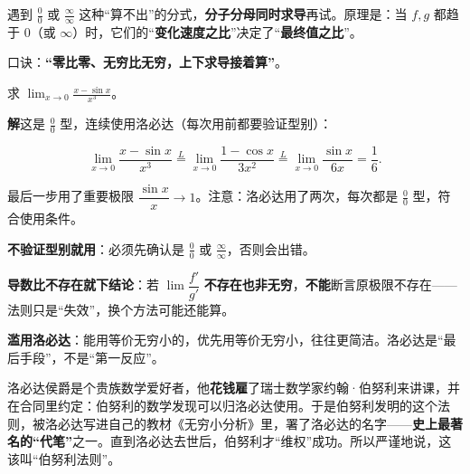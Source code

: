 \documentclass[11pt,a4paper]{article}
\newcommand{\keyw}[1]{\colorbox{cYellowL}{\textbf{\color{cOrange}#1}}}
\begin{document}
\begin{plainbox}[白话解读：洛必达 = “上下同时求导”]
遇到 $\tfrac{0}{0}$ 或 $\tfrac{\infty}{\infty}$ 这种“算不出”的分式，\keyw{分子分母同时求导}再试。原理是：当 $f,g$ 都趋于 $0$（或 $\infty$）时，它们的“\textbf{变化速度之比}”决定了“\textbf{最终值之比}”。

口诀：\keyw{“零比零、无穷比无穷，上下求导接着算”}。
\end{plainbox}

\begin{egbox}[洛必达法则求极限]
求 $\displaystyle\lim_{x\to 0}\frac{x-\sin x}{x^3}$。

\textbf{解}\quad 这是 $\tfrac{0}{0}$ 型，连续使用洛必达（每次用前都要验证型别）：
\begin{eqbox}\[ \lim_{x\to 0}\frac{x-\sin x}{x^3}
   \overset{L}{=}\lim_{x\to 0}\frac{1-\cos x}{3x^2}
   \overset{L}{=}\lim_{x\to 0}\frac{\sin x}{6x}
   =\boxed{\frac{1}{6}}. \]\end{eqbox}
最后一步用了重要极限 $\dfrac{\sin x}{x}\to 1$。注意：洛必达用了两次，每次都是 $\tfrac{0}{0}$ 型，符合使用条件。
\end{egbox}

\begin{warnbox}[易错：洛必达的三大误用]
\begin{pkdot}
  \item \textbf{不验证型别就用}：必须先确认是 $\tfrac{0}{0}$ 或 $\tfrac{\infty}{\infty}$，否则会出错。
  \item \textbf{导数比不存在就下结论}：若 $\lim\dfrac{f'}{g'}$ \textbf{不存在也非无穷}，\keyw{不能}断言原极限不存在——法则只是“失效”，换个方法可能还能算。
  \item \textbf{滥用洛必达}：能用等价无穷小的，优先用等价无穷小，往往更简洁。洛必达是“最后手段”，不是“第一反应”。
\end{pkdot}
\end{warnbox}

\begin{eggbox}
洛必达侯爵是个贵族数学爱好者，他\textbf{花钱雇}了瑞士数学家约翰·伯努利来讲课，并在合同里约定：伯努利的数学发现可以归洛必达使用。于是伯努利发明的这个法则，被洛必达写进自己的教材《无穷小分析》里，署了洛必达的名字——\keyw{史上最著名的“代笔”}之一。直到洛必达去世后，伯努利才“维权”成功。所以严谨地说，这该叫“伯努利法则”。
\end{eggbox}
\end{document}
